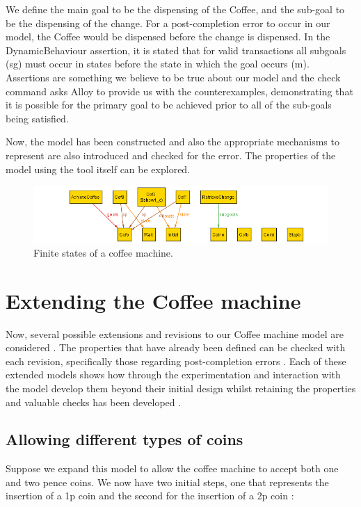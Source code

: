 \documentclass[a4paper,10pt]{report}
\begin{document}
We define the main goal to be the dispensing of the Coffee, and the sub-goal to be the dispensing of the change. For a post-completion error to occur in our model, the Coffee would be dispensed before the change is dispensed. In the DynamicBehaviour assertion, it is stated that for valid transactions all subgoals (sg) must occur in states before the state in which the goal occurs (m). Assertions are something we believe to be true about our model and the check command asks Alloy to provide us with the counterexamples, demonstrating that it is possible for the primary goal to be achieved prior to all of the sub-goals being satisfied.

Now, the model has been constructed and also the appropriate mechanisms to represent are also introduced and checked for the error. The properties of the model using the tool itself can be explored. 

\begin{figure}[h!]
\centering
 \includegraphics[width= 1\textwidth]{viz1.png}
\caption{Finite states of a coffee machine.}
\end{figure}
 
\section{Extending the Coffee machine}
\label{Cofee machine ext}

Now, several possible extensions and revisions to our Coffee machine model are considered \cite{Boyatt}. The properties that have already been defined can be checked with each revision, specifically those regarding post-completion errors \cite{Boyatt}. Each of these extended models shows how through the experimentation and interaction with the model develop them beyond their initial design whilst retaining the properties and valuable checks has been developed \cite{Boyatt}.

\subsection{Allowing different types of coins}
\label{Allowing different types coins}

Suppose we expand this model to allow the coffee machine to accept both one and two pence coins. We now have two initial steps, one that represents the insertion of a 1p coin and the second for the insertion of a 2p coin \cite{Boyatt}:
\end{document}
